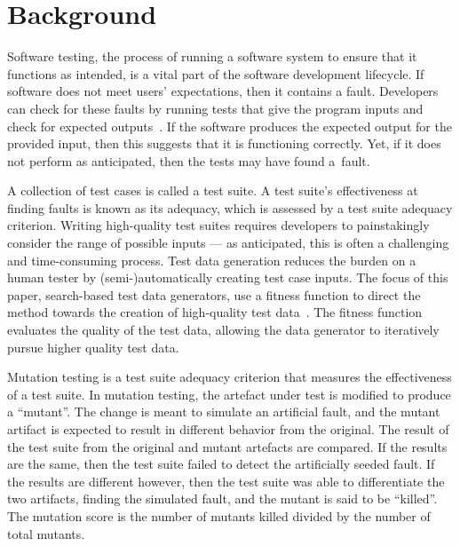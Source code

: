 \section{Background}\label{sec:background}


Software testing, the process of running a software system to ensure that it functions as intended, is a vital part of
the software development lifecycle. If software does not meet users' expectations, then it contains a fault.  Developers
can check for these faults by running tests that give the program inputs and check for expected
outputs~\cite{ammann2008}.  If the software produces the expected output for the provided input, then this suggests that
it is functioning correctly.  Yet, if it does not perform as anticipated, then the tests may have found \mbox{a fault}.


A collection of test cases is called a test suite. A test suite's effectiveness at finding faults is known as its
adequacy, which is assessed by a test suite adequacy criterion.  Writing high-quality test suites requires developers to
painstakingly consider the range of possible inputs --- as anticipated, this is often a challenging and time-consuming
process. Test data generation reduces the burden on a human tester by (semi-)automatically creating test case inputs.
The focus of this paper, search-based test data generators, use a fitness function to direct the method towards the
creation of high-quality test data~\cite{STVR:STVR294}. The fitness function evaluates the quality of the test data,
allowing the data generator to iteratively pursue higher quality test data.


Mutation testing is a test suite adequacy criterion that measures the effectiveness of a test suite. In mutation
testing, the artefact under test is modified to produce a ``mutant''. The change is meant to simulate an artificial
fault, and the mutant artifact is expected to result in different behavior from the original. The result of the test
suite from the original and mutant artefacts are compared. If the results are the same, then the test suite failed to
detect the artificially seeded fault. If the results are different however, then the test suite was able to
differentiate the two artifacts, finding the simulated fault, and the mutant is said to be ``killed''.  The mutation
score is the number of mutants killed divided by the number of total mutants.

